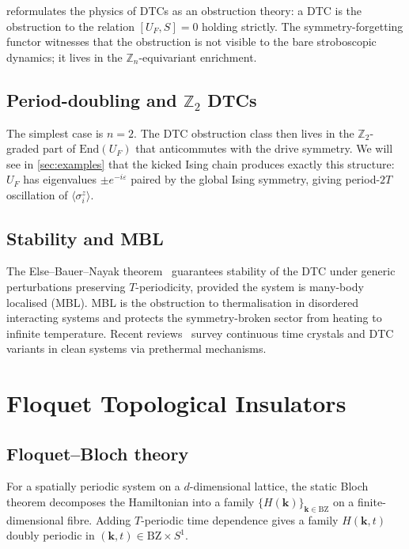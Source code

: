 \documentclass[12pt]{article}
\theoremstyle{definition}
\theoremstyle{remark}
\newcommand{\Z}{\mathbb{Z}}
\begin{document}
 reformulates the physics of DTCs as an obstruction theory: a DTC is the obstruction to the relation $[U_F,S]=0$ holding strictly. The symmetry-forgetting functor witnesses that the obstruction is not visible to the bare stroboscopic dynamics; it lives in the $\Z_n$-equivariant enrichment.

\subsection{Period-doubling and \texorpdfstring{$\Z_2$}{Z2} DTCs}

The simplest case is $n=2$. The DTC obstruction class then lives in the $\Z_2$-graded part of $\mathrm{End}(U_F)$ that anticommutes with the drive symmetry. We will see in \cref{sec:examples} that the kicked Ising chain produces exactly this structure: $U_F$ has eigenvalues $\pm e^{-i\varepsilon}$ paired by the global Ising symmetry, giving period-$2T$ oscillation of $\langle\sigma^z_i\rangle$.

\subsection{Stability and MBL}

The Else--Bauer--Nayak theorem~\cite{else2016} guarantees stability of the DTC under generic perturbations preserving $T$-periodicity, provided the system is many-body localised (MBL). MBL is the obstruction to thermalisation in disordered interacting systems and protects the symmetry-broken sector from heating to infinite temperature. Recent reviews~\cite{else2020review} survey continuous time crystals and DTC variants in clean systems via prethermal mechanisms.

\section{Floquet Topological Insulators}
\label{sec:floquet-topological}

\subsection{Floquet--Bloch theory}

For a spatially periodic system on a $d$-dimensional lattice, the static Bloch theorem decomposes the Hamiltonian into a family $\{H(\mathbf{k})\}_{\mathbf{k}\in\mathrm{BZ}}$ on a finite-dimensional fibre. Adding $T$-periodic time dependence gives a family $H(\mathbf{k},t)$ doubly periodic in $(\mathbf{k},t)\in\mathrm{BZ}\times S^1$.
\end{document}
